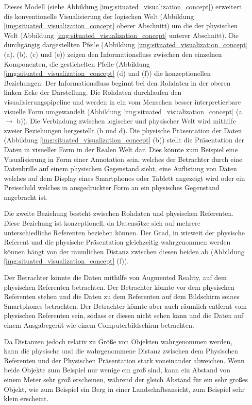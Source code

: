 Dieses Modell (siehe Abbildung \ref{img:situated_visualization_concept}) erweitert die konventionelle Visualisierung der logischen Welt (Abbildung \ref{img:situated_visualization_concept} oberer Abschnitt) um die der physischen Welt (Abbildung \ref{img:situated_visualization_concept} unterer Abschnitt). 
Die durchgängig dargestellten Pfeile (Abbildung \ref{img:situated_visualization_concept} (a), (b), (c) und (e)) zeigen den Informationsfluss zwischen den einzelnen Komponenten, die gestichelten Pfeile (Abbildung \ref{img:situated_visualization_concept} (d) und (f)) die konzeptionellen Beziehungen. Der Informationsfluss beginnt bei den Rohdaten in der oberen linken Ecke der Darstellung. Die Rohdaten durchlaufen den \gls{visualisierungspipeline} und werden in ein vom Menschen besser interpretierbare visuelle Form umgewandelt (Abbildung \ref{img:situated_visualization_concept} (a $\rightarrow$ b)). Die Verbindung zwischen logischer und physischer Welt wird mithilfe zweier Beziehungen hergestellt (b und d). 
Die physische Präsentation der Daten (Abbildung \ref{img:situated_visualization_concept} (b)) stellt die Präsentation der Daten in visueller Form in der Realen Welt dar. 
Dies könnte zum Beispiel eine Visualisierung in Form einer Annotation sein, welches der Betrachter durch eine Datenbrille auf einem physischen Gegenstand sieht, eine Auflistung von Daten welches 
auf dem  Display eines Smartphones oder Tablett angezeigt wird oder ein Preisschild welches in ausgedruckter Form an ein physisches Gegenstand angebracht ist.

Die zweite Beziehung besteht zwischen Rohdaten und physischen Referenten. Diese Beziehung ist konzeptionell, da Datensätze sich auf mehrere unterschiedliche Referenten beziehen können. 
Der Grad, in wieweit der physische Referent und die physische Präsentation gleichzeitig wahrgenommen werden können hängt von der räumlichen Distanz zwischen diesen beiden ab (Abbildung \ref{img:situated_visualization_concept} (f)). 

Der Betrachter könnte die Daten mithilfe von Augmented Reality, auf dem physischen Referenten betrachten. Der Betrachter könnte vor dem physischen Referenten stehen und die Daten zu dem Referenten auf
dem Bildschirm seines Smartphones betrachten. Der Betrachter könnte aber auch räumlich entfernt vom physischen Referenten sein, sodass er diesen nicht sehen kann und die Daten auf einem Ausgabegerät 
wie einem Computerbildschirm betrachten. 

\cite[S.~194]{Marriott2018} Da Distanzen jedoch relativ zu Größe von Objekten wahrgenommen werden, kann die physische und die wahrgenommene Distanz zwischen dem Physischen Referenten und der Physischen Präsentation stark voneinander abweichen. Wenn beide Objekte zum Beispiel nur wenige cm groß sind, kann ein Abstand von einem Meter sehr groß erscheinen, während der gleich Abstand für ein sehr großes Objekt, wie zum Beispiel ein Berg in einer Landschaftsansicht, zum Beispiel sehr klein erscheint. 

